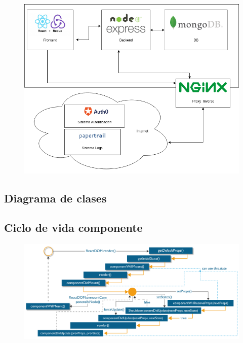 \begin{figure}
  \begin{center}
    \includegraphics[width=\textwidth]{imagenes/diagrama_conceptual.png}
    \caption{}
    \label{fig:}
  \end{center}
\end{figure}


\subsection {Diagrama de clases}
\subsection {Ciclo de vida componente}

\begin{figure}
  \begin{center}
    \includegraphics[width=\textwidth]{imagenes/ReactDOM_edureka.png}
    \caption{}
    \label{fig:}
  \end{center}
\end{figure}

